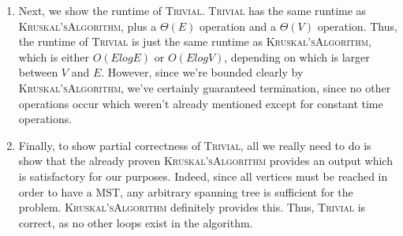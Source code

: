 \documentclass{article}
\begin{document}
\begin{enumerate}
\begin{enumerate}
	\item Next, we show the runtime of \textsc{Trivial}. \textsc{Trivial} has the same runtime as \textsc{Kruskal'sAlgorithm}, plus a
		$\Theta(E)$ operation and a $\Theta(V)$ operation. Thus, the runtime of \textsc{Trivial} is just the same runtime as 
				\textsc{Kruskal'sAlgorithm}, which is either $O(ElogE)$ or $O(ElogV)$, depending on which is larger
				between $V$ and $E$. However, since we're bounded clearly by \textsc{Kruskal'sAlgorithm}, we've certainly
				guaranteed termination, since no other operations occur which weren't already mentioned except for constant
				time operations.
	\item Finally, to show partial correctness of \textsc{Trivial}, all we really need to do is show that the already
		proven \textsc{Kruskal'sAlgorithm} provides an output which is satisfactory for our purposes. Indeed, since all
		vertices must be reached in order to have a MST, any arbitrary spanning tree is sufficient for the problem. 
		\textsc{Kruskal'sAlgorithm} definitely provides this. Thus, \textsc{Trivial} is correct, as no other loops exist
		in the algorithm.
		\end{enumerate}


\end{enumerate}
\end{document}
